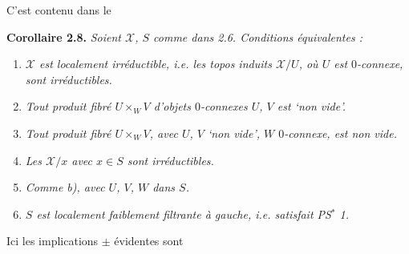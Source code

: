 \documentclass[11pt]{article}
\newcommand{\msp}[1]{\marginpar{\footnotesize [#1]}}
\newcommand{\sX}{\mathcal{X}} %
\begin{document}
\msp{page 21}

\noindent C'est contenu dans le

\noindent\textbf{Corollaire 2.8.} \textit{Soient $\sX$, $S$ comme dans 2.6. Conditions équivalentes :}
\begin{enumerate}[label={},leftmargin=3em]
\item[\textit{a)}] \textit{$\sX$ est localement irréductible, i.e. les topos induits $\sX/U$, où $U$ est $0$-connexe, sont irréductibles.}
\item[\textit{b)}] \textit{Tout produit fibré $U \times_W V$ d'objets $0$-connexes $U$, $V$ est `non vide'.}
\item[\textit{b$'$)}] \textit{Tout produit fibré $U \times_W V$, avec $U$, $V$ `non vide', $W$ $0$-connexe, est non vide.}
\item[\textit{c)}] \textit{Les $\sX/x$ avec $x \in S$ sont irréductibles.}
\item[\textit{d)}] \textit{Comme b), avec $U$, $V$, $W$ dans $S$.}
\item[\textit{e)}] \textit{$S$ est localement faiblement filtrante à gauche, i.e. satisfait PS$^*$ 1.}
\end{enumerate}
\noindent Ici les implications $\pm$ évidentes sont
\end{document}
